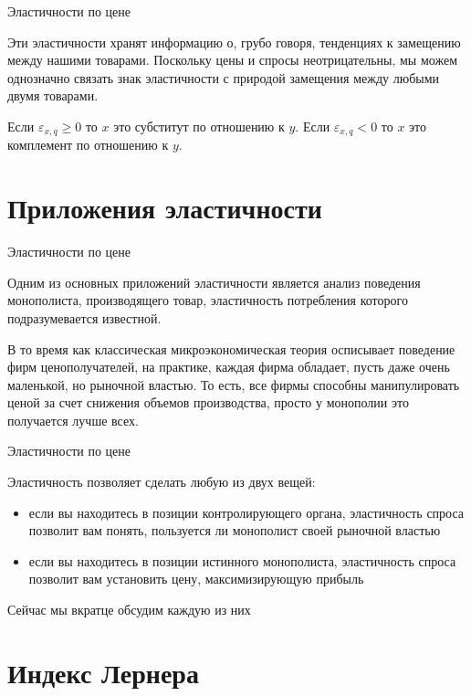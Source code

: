 \documentclass{beamer}
\begin{document}
\begin{frame}{Эластичности по цене}

Эти эластичности хранят информацию о, грубо говоря, тенденциях к замещению между нашими товарами. Поскольку цены и спросы неотрицательны, мы можем однозначно связать знак эластичности с природой замещения между любыми двумя товарами.

Если $\varepsilon_{x,q} \geqslant 0$ то $x$ это субститут по отношению к $y$. Если $\varepsilon_{x,q} < 0$ то $x$ это комплемент по отношению к $y$.

\end{frame}

\section{Приложения эластичности}

\begin{frame}{Эластичности по цене}

Одним из основных приложений эластичности является анализ поведения монополиста, производящего товар, эластичность потребления которого подразумевается известной.

В то время как классическая микроэкономическая теория осписывает поведение фирм ценополучателей, на практике, каждая фирма обладает, пусть даже очень маленькой, но рыночной властью. То есть, все фирмы способны манипулировать ценой за счет снижения объемов производства, просто у монополии это получается лучше всех.

\end{frame}

\begin{frame}{Эластичности по цене}

Эластичность позволяет сделать любую из двух вещей:

\begin{itemize}
\item если вы находитесь в позиции контролирующего органа, эластичность спроса позволит вам понять, пользуется ли монополист своей рыночной властью
\item если вы находитесь в позиции истинного монополиста, эластичность спроса позволит вам установить цену, максимизирующую прибыль
\end{itemize}

Сейчас мы вкратце обсудим каждую из них

\end{frame}

\section{Индекс Лернера}
\end{document}
